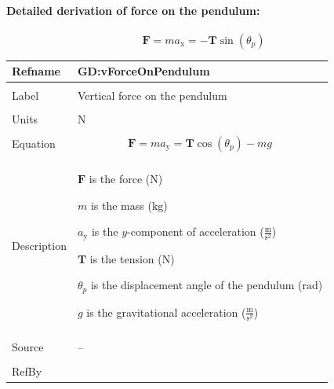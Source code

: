 \documentclass[12pt]{article}
\begin{document}
\paragraph{Detailed derivation of force on the pendulum:}
\label{GD:hForceOnPendulumDeriv}
\begin{displaymath}
\symbf{F}=m {a_{\text{x}}}=-\symbf{T} \sin\left({θ_{p}}\right)
\end{displaymath}
\vspace{\baselineskip}
\noindent
\begin{minipage}{\textwidth}
\begin{tabular}{>{\raggedright}p{}>{\raggedright\arraybackslash}p{}}
\toprule \textbf{Refname} & \textbf{GD:vForceOnPendulum}
\label{GD:vForceOnPendulum}
\\ \midrule \\
Label & Vertical force on the pendulum
        
\\ \midrule \\
Units & ${\text{N}}$
        
\\ \midrule \\
Equation & \begin{displaymath}
           \symbf{F}=m {a_{\text{y}}}=\symbf{T} \cos\left({θ_{p}}\right)-m g
           \end{displaymath}
\\ \midrule \\
Description & \begin{symbDescription}
              \item{$\symbf{F}$ is the force (${\text{N}}$)}
              \item{$m$ is the mass (${\text{kg}}$)}
              \item{${a_{\text{y}}}$ is the $y$-component of acceleration ($\frac{\text{m}}{\text{s}^{2}}$)}
              \item{$\symbf{T}$ is the tension (${\text{N}}$)}
              \item{${θ_{p}}$ is the displacement angle of the pendulum (${\text{rad}}$)}
              \item{$g$ is the gravitational acceleration ($\frac{\text{m}}{\text{s}^{2}}$)}
              \end{symbDescription}
\\ \midrule \\
Source & --
         
\\ \midrule \\
RefBy & 
\\ \bottomrule
\end{tabular}
\end{minipage}
\end{document}
